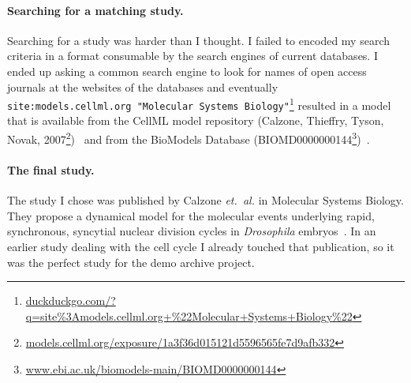 \paragraph{Searching for a matching study.}
Searching for a study was harder than I thought.
I failed to encoded my search criteria in a format consumable by the search engines of current databases.
I ended up asking a common search engine to look for names of open access journals at the websites of the databases and eventually \texttt{site:models.cellml.org "Molecular Systems Biology"}\footnote{\href{https://duckduckgo.com/?q=site\%3Amodels.cellml.org+\%22Molecular+Systems+Biology\%22}{duckduckgo.com/?q=site\%3Amodels.cellml.org+\%22Molecular+Systems+Biology\%22}} resulted in a model that is available from the CellML model repository (Calzone, Thieffry, Tyson, Novak, 2007\footnote{\href{http://models.cellml.org/exposure/1a3f36d015121d5596565fe7d9afb332}{models.cellml.org/exposure/1a3f36d015121d5596565fe7d9afb332}})~\cite{cellmlrepo} and from the BioModels Database (BIOMD0000000144\footnote{\href{http://www.ebi.ac.uk/biomodels-main/BIOMD0000000144}{www.ebi.ac.uk/biomodels-main/BIOMD0000000144}})~\cite{biomodels}.


\paragraph{The final study.}
The study I chose was published by Calzone \emph{et.~al.} in Molecular Systems Biology. They propose a dynamical model for the molecular events underlying rapid, synchronous, syncytial nuclear division cycles in \textit{Drosophila} embryos~\cite{Calzone2007}.
In an earlier study dealing with the cell cycle I already touched that publication, so it was the perfect study for the demo archive project.




